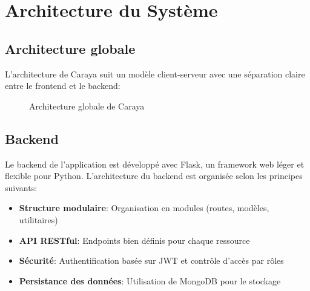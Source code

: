 \documentclass[12pt,a4paper]{report}
\begin{document}
\chapter{Architecture du Système}
\section{Architecture globale}
L'architecture de Caraya suit un modèle client-serveur avec une séparation claire entre le frontend et le backend:

\begin{figure}[H]
    \centering
    \caption{Architecture globale de Caraya}
\end{figure}

\section{Backend}
Le backend de l'application est développé avec Flask, un framework web léger et flexible pour Python. L'architecture du backend est organisée selon les principes suivants:

\begin{itemize}
    \item \textbf{Structure modulaire}: Organisation en modules (routes, modèles, utilitaires)
    \item \textbf{API RESTful}: Endpoints bien définis pour chaque ressource
    \item \textbf{Sécurité}: Authentification basée sur JWT et contrôle d'accès par rôles
    \item \textbf{Persistance des données}: Utilisation de MongoDB pour le stockage
\end{itemize}
\end{document}
